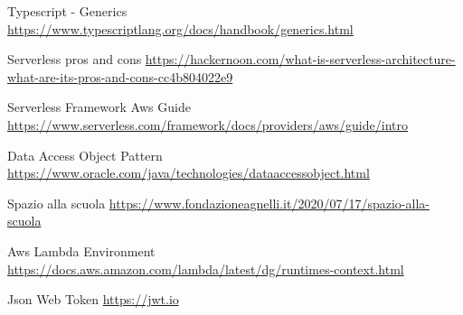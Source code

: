 \begin{thebibliography}{9}
     Typescript - Generics
    \url{https://www.typescriptlang.org/docs/handbook/generics.html}

     Serverless pros and cons
    \url{https://hackernoon.com/what-is-serverless-architecture-what-are-its-pros-and-cons-cc4b804022e9}

     Serverless Framework Aws Guide
    \url{https://www.serverless.com/framework/docs/providers/aws/guide/intro}

     Data Access Object Pattern
    \url{https://www.oracle.com/java/technologies/dataaccessobject.html}

     Spazio alla scuola
    \url{https://www.fondazioneagnelli.it/2020/07/17/spazio-alla-scuola}

     Aws Lambda Environment
    \url{https://docs.aws.amazon.com/lambda/latest/dg/runtimes-context.html}

     Json Web Token
    \url{https://jwt.io}

\end{thebibliography}
